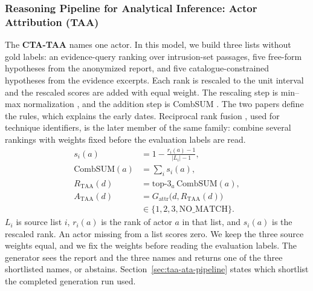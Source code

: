 \documentclass[5p,times,authoryear]{elsarticle}
\begin{document}
\subsubsection{Reasoning Pipeline for Analytical Inference: Actor Attribution (TAA)}
The \textbf{CTA-TAA} names one actor. In this model, we build three lists without gold labels: an evidence-query ranking over intrusion-set passages, five free-form hypotheses from the anonymized report, and five catalogue-constrained hypotheses from the evidence excerpts. Each rank is rescaled to the unit interval and the rescaled scores are added with equal weight. The rescaling step is min--max normalization \citeyearpar{lee1997ir}, and the addition step is CombSUM \citeyearpar{fox1994combination}. The two papers define the rules, which explains the early dates. Reciprocal rank fusion \citep{cormack2009rrf}, used for technique identifiers, is the later member of the same family: combine several rankings with weights fixed before the evaluation labels are read.
\begin{align}
s_i(a)&=1-\frac{r_i(a)-1}{|L_i|-1},\label{eq:taa-norm}\\
\mathrm{CombSUM}(a)&=\sum_{i}s_i(a),\label{eq:taa-combsum}\\
R_{\mathrm{TAA}}(d)&=\mathrm{top}\text{-}3_a\,\mathrm{CombSUM}(a),\label{eq:taa3}\\
A_{\mathrm{TAA}}(d)&=G_{\mathrm{attr}}\bigl(d,R_{\mathrm{TAA}}(d)\bigr)\label{eq:taa4}\\
&\in\{1,2,3,\mathrm{NO\_MATCH}\}.\nonumber
\end{align}
$L_i$ is source list $i$, $r_i(a)$ is the rank of actor $a$ in that list, and $s_i(a)$ is the rescaled rank. An actor missing from a list scores zero. We keep the three source weights equal, and we fix the weights before reading the evaluation labels. The generator sees the report and the three names and returns one of the three shortlisted names, or abstains. Section~\ref{sec:taa-ata-pipeline} states which shortlist the completed generation run used.

\end{document}
